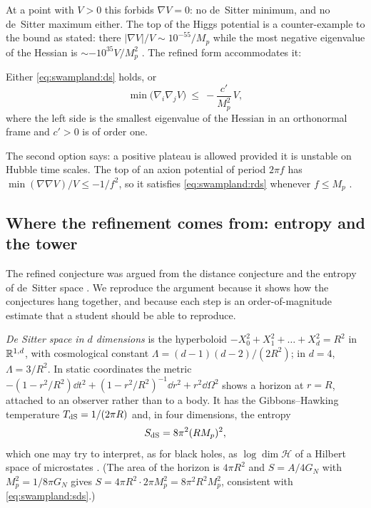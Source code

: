 At a point with $V>0$ this forbids $\nabla V=0$: no de~Sitter minimum, and no de~Sitter maximum
either. The top of the Higgs potential is a counter-example to the bound as stated: there
$|\nabla V|/V\sim10^{-55}/M_p$ while the most negative eigenvalue of the Hessian is
$\sim-10^{35}V/M_p^2$ . The refined form accommodates it:

\begin{conjecture}\label{conj:swampland:rds}
Either \eqref{eq:swampland:ds} holds, or
\begin{equation}\label{eq:swampland:rds}
\min\big(\nabla_i\nabla_jV\big)\ \le\ -\frac{c'}{M_p^2}\,V ,
\end{equation}
where the left side is the smallest eigenvalue of the Hessian in an orthonormal frame and
$c'>0$ is of order one. 
\end{conjecture}

The second option says: a positive plateau is allowed provided it is unstable on Hubble time
scales. The top of an axion potential of period $2\pi f$ has $\min(\nabla\nabla V)/V\le-1/f^2$, so
it satisfies \eqref{eq:swampland:rds} whenever $f\le M_p$ .

\subsection{Where the refinement comes from: entropy and the tower}

The refined conjecture was argued from the distance conjecture and the entropy of de~Sitter
space . We reproduce the argument because it shows how the
conjectures hang together, and because each step is an order-of-magnitude estimate that a
student should be able to reproduce.

\emph{De Sitter space in $d$ dimensions} is the hyperboloid $-X_0^2+X_1^2+\dots+X_d^2=R^2$ in
$\mathbb{R}^{1,d}$, with cosmological constant $\Lambda=(d-1)(d-2)/(2R^2)$; in $d=4$, $\Lambda=3/R^2$. In
static coordinates the metric $-(1-r^2/R^2)\dd t^2+(1-r^2/R^2)^{-1}\dd r^2+r^2\dd\Omega^2$ shows a
horizon at $r=R$, attached to an observer rather than to a body. It has the Gibbons--Hawking
temperature $T_{\rm dS}=1/(2\pi R)$ and, in four dimensions, the entropy
\begin{equation}\label{eq:swampland:sds}
S_{\rm dS}=8\pi^2(RM_p)^2 ,
\end{equation}
which one may try to interpret, as for black holes, as $\log\dim\mathcal H$ of a Hilbert space of
microstates . (The area of the horizon is $4\pi R^2$ and
$S=A/4G_N$ with $M_p^2=1/8\pi G_N$ gives $S=4\pi R^2\cdot2\pi M_p^2=8\pi^2R^2M_p^2$, consistent
with \eqref{eq:swampland:sds}.)

